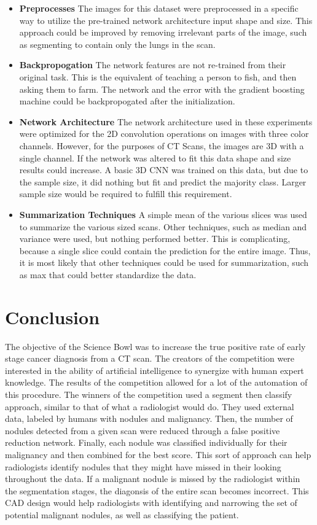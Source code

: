 \documentclass[conference,11pt]{IEEEtran}
\begin{document}
\begin{itemize}
\item \textbf{Preprocesses} The images for this dataset were preprocessed in a specific way to utilize the pre-trained network architecture input shape and size. This approach could be improved by removing irrelevant parts of the image, such as segmenting to contain only the lungs in the scan.
\item \textbf{Backpropogation} The network features are not re-trained from their original task. This is the equivalent of teaching a person to fish, and then asking them to farm. The network and the error with the gradient boosting machine could be backpropogated after the initialization.
\item \textbf{Network Architecture} The network architecture used in these experiments were optimized for the 2D convolution operations on images with three color channels. However, for the purposes of CT Scans, the images are 3D with a single channel. If the network was altered to fit this data shape and size results could increase. A basic 3D CNN was trained on this data, but due to the sample size, it did nothing but fit and predict the majority class. Larger sample size would be required to fulfill this requirement.
\item \textbf{Summarization Techniques} A simple mean of the various slices was used to summarize the various sized scans. Other techniques, such as median and variance were used, but nothing performed better. This is complicating, because a single slice could contain the prediction for the entire image. Thus, it is most likely that other techniques could be used for summarization, such as max that could better standardize the data.
\end{itemize}

\section{Conclusion}

The objective of the Science Bowl was to increase the true positive rate of early stage cancer diagnosis from a CT scan. The creators of the competition were interested in the ability of artificial intelligence to synergize with human expert knowledge. The results of the competition allowed for a lot of the automation of this procedure. The winners of the competition used a segment then classify approach, similar to that of what a radiologist would do. They used external data, labeled by humans with nodules and malignancy. Then, the number of nodules detected from a given scan were reduced through a false positive reduction network. Finally, each nodule was classified individually for their malignancy and then combined for the best score. This sort of approach can help radiologists identify nodules that they might have missed in their looking throughout the data. If a malignant nodule is missed by the radiologist within the segmentation stages, the diagonsis of the entire scan becomes incorrect. This CAD design would help radiologists with identifying and narrowing the set of potential malignant nodules, as well as classifying the patient.
\end{document}
